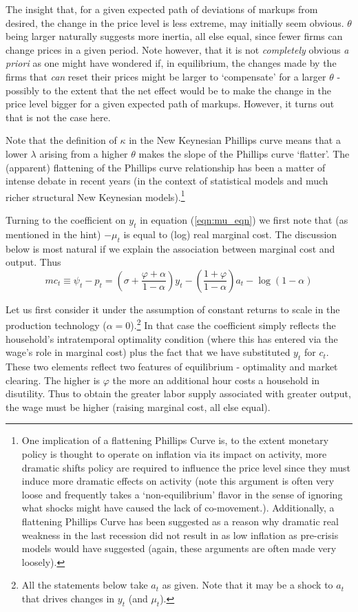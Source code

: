 \documentclass[authoryear,11pt]{elsarticle}
\begin{document}
The insight that, for a given expected path of deviations of markups from desired, the change in the price level is less extreme, may initially seem obvious. $\theta$ being larger naturally suggests more inertia, all else equal, since fewer firms can change prices in a given period. Note however, that it is not \emph{completely} obvious \emph{a priori} as one might have wondered if, in equilibrium, the changes made by the firms that \emph{can} reset their prices might be larger to `compensate' for a larger $\theta$ - possibly to the extent that the net effect would be to make the change in the price level bigger for a given expected path of markups. However, it turns out that is not the case here.

Note that the definition of $\kappa$ in the New Keynesian Phillips curve means that a lower $\lambda$ arising from a higher $\theta$ makes the slope of the Phillips curve `flatter'. The (apparent) flattening of the Phillips curve relationship has been a matter of intense debate in recent years (in the context of statistical models and much richer structural New Keynesian models).\footnote{One implication of a flattening Phillips Curve is, to the extent monetary policy is thought to operate on inflation via its impact on activity, more dramatic shifts policy are required to influence the price level since they must induce more dramatic effects on activity (note this argument is often very loose and frequently takes a `non-equilibrium' flavor in the sense of ignoring what shocks might have caused the lack of co-movement.). Additionally, a flattening Phillips Curve has been suggested as a reason why dramatic real weakness in the last recession did not result in as low inflation as pre-crisis models would have suggested (again, these arguments are often made very loosely).}

Turning to the coefficient on $y_{t}$ in equation (\ref{eqn:mu_eqn}) we first note that (as mentioned in the hint) $-\mu_{t}$ is equal to (log) real marginal cost. The discussion below is most natural if we explain the association between marginal cost and output. Thus
\[
mc_{t} \equiv \psi_{t} - p_{t}= \left( \sigma + \frac{\varphi + \alpha}{1-\alpha} \right)y_{t} - \left( \frac{1+\varphi}{1-\alpha} \right) a_{t} - \log{(1-\alpha)}
\]

Let us first consider it under the assumption of constant returns to scale in the production technology ($\alpha=0$).\footnote{All the statements below take $a_{t}$ as given. Note that it may be a shock to $a_{t}$ that drives changes in $y_{t}$ (and $\mu_{t}$).} In that case the coefficient simply reflects the household's intratemporal optimality condition (where this has entered via the wage's role in marginal cost) plus the fact that we have substituted $y_{t}$ for $c_{t}$. These two elements reflect two features of equilibrium - optimality and market clearing. The higher is $\varphi$ the more an additional hour costs a household in disutility. Thus to obtain the greater labor supply associated with greater output, the wage must be higher (raising marginal cost, all else equal).
\end{document}
